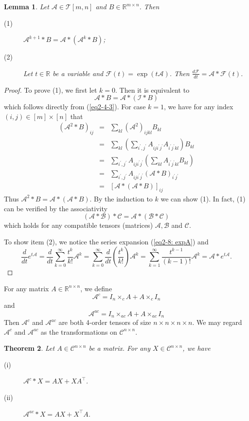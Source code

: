 \documentclass[11pt, oneside]{article}  %
\newtheorem{thm}{Theorem}[section]
\newtheorem{lem}[thm]{Lemma}
\newcommand{\p}{\prime}
\newcommand{\RR}{\mathbb{R}}
\newcommand{\A}{\mathcal{A}}
\newcommand{\B}{\mathcal{B}}
\newcommand{\C}{\mathcal{C}}
\newcommand{\caF}{\mathcal{F}}
\newcommand{\caI}{\mathcal{I}}
\newcommand{\T}{\mathcal{T}}
\newcommand{\beq}{\begin{equation}}
\newcommand{\eeq}{\end{equation}}
\newcommand{\beyy}{\begin{eqnarray*}}
\newcommand{\eeyy}{\end{eqnarray*}}
\begin{document}
\begin{lem}\label{le2-4}
Let $\A\in\T[m,n]$ and $B\in\RR^{m\times n}$. Then
\begin{description}
\item[(1)]  $\A^{k+1}\ast B =\A\ast (\A^{k}\ast B)$;
\item[(2)]  Let $t\in\RR$ be a variable and $\caF(t)=\exp(t\A)$.  Then $\frac{d\caF}{dt}=\A\ast \caF(t)$. 
\end{description}
\end{lem}

\begin{proof}
To prove (1), we first let $k=0$. Then it is equivalent to 
\[ \A\ast B = \A\ast (\caI\ast B) \]
which follows directly from (\ref{eq2-4-3}).   For case $k=1$, we have for any index $(i,j)\in [m]\times [n]$ that 
\beyy
(\A^2\ast B)_{ij} &=& \sum_{kl} (\A^{2})_{ijkl}B_{kl}\\
                             &=& \sum_{kl} \left(\sum_{i^{\p},j^{\p}} A_{iji^{\p}j^{\p}}A_{i^{\p}j^{\p}kl}\right) B_{kl}\\
                             &=& \sum_{i^{\p},j^{\p}} A_{iji^{\p}j^{\p}} \left(\sum_{kl} A_{i^{\p}j^{\p}kl}B_{kl}\right) \\
                             &=& \sum_{i^{\p},j^{\p}} A_{iji^{\p}j^{\p}} (\A\ast B)_{i^{\p}j^{\p}}\\
                             &=& \left[ \A\ast (\A\ast B)\right ]_{ij}
\eeyy
Thus $\A^{2}\ast B =\A\ast (\A\ast B)$. By the induction to $k$ we can show (1).  In fact, (1) can be verified by the associativity  
\[ (\A\ast \B)\ast \C = \A \ast (\B\ast \C)  \]
which holds for any compatible tensors (matrices) $\A, \B$ and $\C$. \par 
\indent  To show item (2), we notice the series expansion 
(\ref{eq2-8: expA})  and 
\[
\frac{d}{dt} e^{t\A} =\frac{d}{dt} \sum_{k=0}^{\infty} \frac{t^{k}}{k!} \A^{k}
=\sum_{k=0}^{\infty} \frac{d}{dt}\left(\frac{t^{k}}{k!}\right) \A^{k}
=\sum_{k=1}^{\infty} \frac{t^{k-1}}{(k-1)!}\A^{k}=\A\ast e^{t\A}.       
\]
\end{proof}

For any matrix $A\in\RR^{n\times n}$, we define 
\beq\label{eq2-3-1} 
\A^{c} = I_{n}\times_{c} A + A\times_{c} I_{n}  
\eeq
and   
\beq\label{eq2-3-2} 
\A^{ac} = I_{n}\times_{ac} A +A \times_{ac} I_{n}
\eeq
Then $\A^{c}$ and $\A^{ac}$ are both 4-order tensors of size $n\times n\times n\times n$.  We may regard $\A^{c}$ and $\A^{ac}$ as the 
transformations on $\C^{n\times n}$.  
\begin{thm}\label{th:2-5}
Let $A\in\C^{n\times n}$ be a matrix.  For any $X\in\C^{n\times n}$, we have 
\begin{description}
\item[(i)]  $\A^{c}\ast X = AX+XA^{\top}$. 
\item[(ii)]  $ \A^{ac}\ast X = AX+X^{\top}A$. 
\end{description}
\end{thm}
\end{document}
